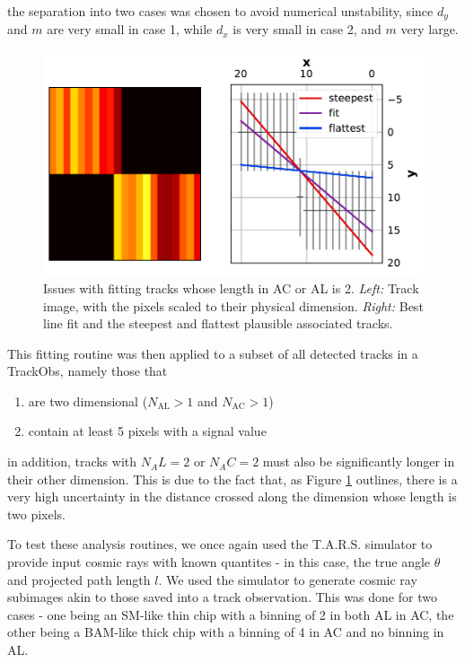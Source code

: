 \documentclass[a4paper, 11pt]{article}
\begin{document}
the separation into two cases was chosen to avoid numerical unstability, since $d_y$ and $m$ are very small in case 1, while $d_x$ is very small in case 2, and $m$ very large.

\begin{figure}
  \centering
  \includegraphics{images/postprocessing/2D_badfit}
  \caption{Issues with fitting tracks whose length in AC or AL is 2. \textit{Left:} Track image, with the pixels scaled to their physical dimension. \textit{Right:} Best line fit and the steepest and flattest plausible associated tracks.}
  \label{fig:2D_badfit}
\end{figure}

This fitting routine was then applied to a subset of all detected tracks in a TrackObs, namely those that
\begin{enumerate}
  \item are two dimensional ($N_\mathrm{AL} > 1$ and $N_\mathrm{AC} > 1$)
  \item contain at least 5 pixels with a signal value
\end{enumerate}

in addition, tracks with $N_AL = 2$ or $N_AC = 2$ must also be significantly longer in their other dimension. This is due to the fact that, as Figure \ref{fig:2D_badfit} outlines, there is a very high uncertainty in the distance crossed along the dimension whose length is two pixels.

To test these analysis routines, we once again used the T.A.R.S. simulator to provide input cosmic rays with known quantites - in this case, the true angle $\theta$ and projected path length $l$. We used the simulator to generate cosmic ray subimages akin to those saved into a track observation. This was done for two cases - one being an SM-like thin chip with a binning of 2 in both AL in AC, the other being a BAM-like thick chip with a binning of 4 in AC and no binning in AL.
\end{document}
